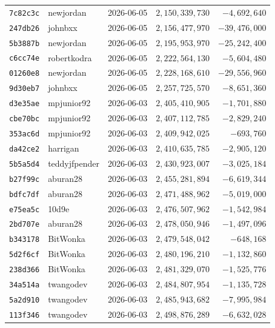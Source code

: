 {\begin{longtable}{@{}lllrr@{}}
\texttt{7c82c3c} & newjordan & 2026-06-05 & $2{,}150{,}339{,}730$ & $-4{,}692{,}640$\\
\texttt{247db26} & johnbxx & 2026-06-05 & $2{,}156{,}477{,}970$ & $-39{,}476{,}000$\\
\texttt{5b3887b} & newjordan & 2026-06-05 & $2{,}195{,}953{,}970$ & $-25{,}242{,}400$\\
\texttt{c6cc74e} & robertkodra & 2026-06-05 & $2{,}222{,}564{,}130$ & $-5{,}604{,}480$\\
\texttt{01260e8} & newjordan & 2026-06-05 & $2{,}228{,}168{,}610$ & $-29{,}556{,}960$\\
\texttt{9d30eb7} & johnbxx & 2026-06-05 & $2{,}257{,}725{,}570$ & $-8{,}651{,}360$\\
\texttt{d3e35ae} & mpjunior92 & 2026-06-03 & $2{,}405{,}410{,}905$ & $-1{,}701{,}880$\\
\texttt{cbe70bc} & mpjunior92 & 2026-06-03 & $2{,}407{,}112{,}785$ & $-2{,}829{,}240$\\
\texttt{353ac6d} & mpjunior92 & 2026-06-03 & $2{,}409{,}942{,}025$ & $-693{,}760$\\
\texttt{da42ce2} & harrigan & 2026-06-03 & $2{,}410{,}635{,}785$ & $-2{,}905{,}120$\\
\texttt{5b5a5d4} & teddyjfpender & 2026-06-03 & $2{,}430{,}923{,}007$ & $-3{,}025{,}184$\\
\texttt{b27f99c} & aburan28 & 2026-06-03 & $2{,}455{,}281{,}894$ & $-6{,}619{,}344$\\
\texttt{bdfc7df} & aburan28 & 2026-06-03 & $2{,}471{,}488{,}962$ & $-5{,}019{,}000$\\
\texttt{e75ea5c} & 10d9e & 2026-06-03 & $2{,}476{,}507{,}962$ & $-1{,}542{,}984$\\
\texttt{2bd707e} & aburan28 & 2026-06-03 & $2{,}478{,}050{,}946$ & $-1{,}497{,}096$\\
\texttt{b343178} & BitWonka & 2026-06-03 & $2{,}479{,}548{,}042$ & $-648{,}168$\\
\texttt{5d2f6cf} & BitWonka & 2026-06-03 & $2{,}480{,}196{,}210$ & $-1{,}132{,}860$\\
\texttt{238d366} & BitWonka & 2026-06-03 & $2{,}481{,}329{,}070$ & $-1{,}525{,}776$\\
\texttt{34a514a} & twangodev & 2026-06-03 & $2{,}484{,}807{,}954$ & $-1{,}135{,}728$\\
\texttt{5a2d910} & twangodev & 2026-06-03 & $2{,}485{,}943{,}682$ & $-7{,}995{,}984$\\
\texttt{113f346} & twangodev & 2026-06-03 & $2{,}498{,}876{,}289$ & $-6{,}632{,}028$\\

\end{longtable}}
